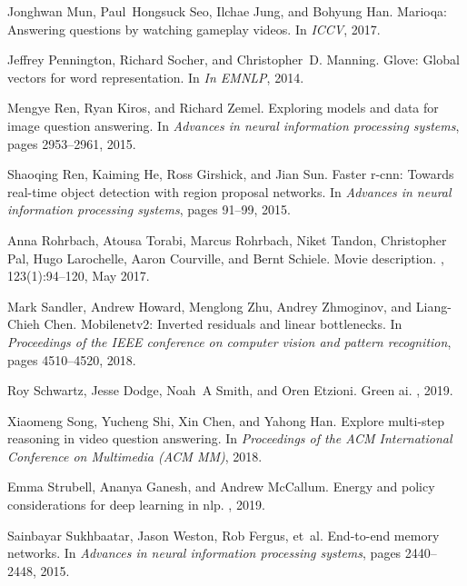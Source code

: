 \documentclass[final]{cvpr}
\begin{document}
{\begin{thebibliography}{10}
Jonghwan Mun, Paul~Hongsuck Seo, Ilchae Jung, and Bohyung Han.
\newblock Marioqa: Answering questions by watching gameplay videos.
\newblock In {\em ICCV}, 2017.

Jeffrey Pennington, Richard Socher, and Christopher~D. Manning.
\newblock Glove: Global vectors for word representation.
\newblock In {\em In EMNLP}, 2014.

Mengye Ren, Ryan Kiros, and Richard Zemel.
\newblock Exploring models and data for image question answering.
\newblock In {\em Advances in neural information processing systems}, pages
  2953--2961, 2015.

Shaoqing Ren, Kaiming He, Ross Girshick, and Jian Sun.
\newblock Faster r-cnn: Towards real-time object detection with region proposal
  networks.
\newblock In {\em Advances in neural information processing systems}, pages
  91--99, 2015.

Anna Rohrbach, Atousa Torabi, Marcus Rohrbach, Niket Tandon, Christopher Pal,
  Hugo Larochelle, Aaron Courville, and Bernt Schiele.
\newblock Movie description.
, 123(1):94–120, May 2017.

Mark Sandler, Andrew Howard, Menglong Zhu, Andrey Zhmoginov, and Liang-Chieh
  Chen.
\newblock Mobilenetv2: Inverted residuals and linear bottlenecks.
\newblock In {\em Proceedings of the IEEE conference on computer vision and
  pattern recognition}, pages 4510--4520, 2018.

Roy Schwartz, Jesse Dodge, Noah~A Smith, and Oren Etzioni.
\newblock Green ai.
, 2019.

Xiaomeng Song, Yucheng Shi, Xin Chen, and Yahong Han.
\newblock Explore multi-step reasoning in video question answering.
\newblock In {\em Proceedings of the ACM International Conference on Multimedia
  (ACM MM)}, 2018.

Emma Strubell, Ananya Ganesh, and Andrew McCallum.
\newblock Energy and policy considerations for deep learning in nlp.
, 2019.

Sainbayar Sukhbaatar, Jason Weston, Rob Fergus, et~al.
\newblock End-to-end memory networks.
\newblock In {\em Advances in neural information processing systems}, pages
  2440--2448, 2015.


\end{thebibliography}}
\end{document}
